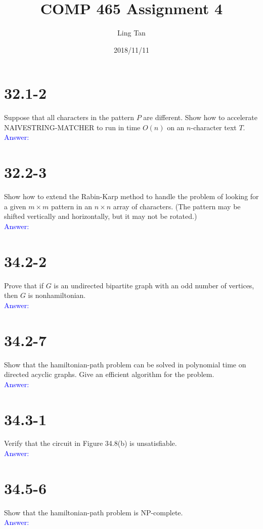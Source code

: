 \documentclass[a4paper]{article}
\title{COMP 465 Assignment 4}
\author{Ling Tan}
\date{2018/11/11}
\begin{document}
\maketitle

\section{32.1-2} Suppose that all characters in the pattern $P$ are different. Show how to accelerate NAIVESTRING-MATCHER to run in time $O(n)$ on an $n$-character text $T$.\\
\textcolor{blue}{Answer:}

\section{32.2-3}
Show how to extend the Rabin-Karp method to handle the problem of looking for a given $m\times m$ pattern in an $n \times n$ array of characters. (The pattern may be shifted vertically and horizontally, but it may not be rotated.)\\
\textcolor{blue}{Answer:}

\section{34.2-2}
Prove that if $G$ is an undirected bipartite graph with an odd number of vertices, then $G$ is nonhamiltonian.\\
\textcolor{blue}{Answer:}

\section{34.2-7}
Show that the hamiltonian-path problem can be solved in polynomial time on directed acyclic graphs. Give an efficient algorithm for the problem.\\
\textcolor{blue}{Answer:}

\section{34.3-1}
Verify that the circuit in Figure 34.8(b) is unsatisfiable.\\
\textcolor{blue}{Answer:}

\section{34.5-6}
Show that the hamiltonian-path problem is NP-complete.\\
\textcolor{blue}{Answer:}
\end{document}
